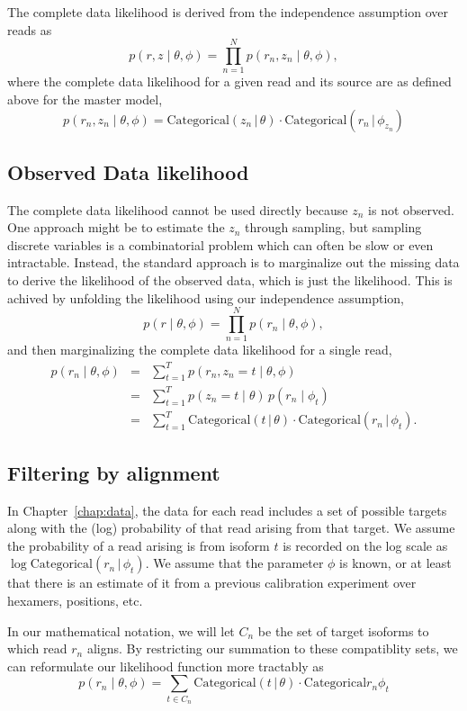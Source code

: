 \documentclass[11pt]{report}
\newcommand{\distro}[3]{\textrm{#1}\!\left( #2 \,|\, #3\right)}
\begin{document}
The complete data likelihood is derived from the independence
assumption over reads as
\[
  p(r, z \mid \theta, \phi)
  = \prod_{n=1}^N p(r_n, z_n \mid \theta, \phi),
\]
where the complete data likelihood for a given read and its source are
as defined above for the master model,
\[
  p(r_n, z_n \mid \theta, \phi)
  = \distro{Categorical}{z_n}{\theta}
  \cdot \distro{Categorical}{r_n}{\phi_{z_n}}
\]

\subsection{Observed Data likelihood}

The complete data likelihood cannot be used directly because $z_n$ is
not observed.  One approach might be to estimate the $z_n$ through
sampling, but sampling discrete variables is a combinatorial problem
which can often be slow or even intractable.  Instead, the standard
approach is to marginalize out the missing data to derive the
likelihood of the observed data, which is just the likelihood.  This
is achived by unfolding the likelihood using our independence
assumption,
\[
  p(r \mid \theta, \phi)
  = \prod_{n=1}^N p(r_n \mid \theta, \phi),
\]
and then marginalizing the complete data likelihood for a single read,
\begin{eqnarray*}
  p(r_n \mid \theta, \phi)
  & = & \textstyle \sum_{t=1}^T p(r_n, z_n = t \mid \theta, \phi)
  \\[4pt]
  & = & \textstyle \sum_{t=1}^T p(z_n = t \mid \theta) \, p(r_n \mid \phi_t)
  \\[4pt]
  & = & \textstyle \sum_{t=1}^T \distro{Categorical}{t}{\theta}
        \cdot \distro{Categorical}{r_n}{\phi_t}.
\end{eqnarray*}

\subsection{Filtering by alignment}

In Chapter~\ref{chap:data}, the data for each read includes a set of
possible targets along with the (log) probability of that read arising
from that target.  We assume the probability of a read arising is from
isoform $t$ is recorded on the log scale as
$\log \distro{Categorical}{r_n}{\phi_t}$.  We assume that the
parameter $\phi$ is known, or at least that there is an estimate of it
from a previous calibration experiment over hexamers, positions, etc.

In our mathematical notation, we will let $C_n$ be the set of target
isoforms to which read $r_n$ aligns.  By restricting our summation to
these compatiblity sets, we can reformulate our likelihood function
more tractably as
\[
  p(r_n \mid \theta, \phi)
  = \textstyle \sum_{t \in C_n}
  \distro{Categorical}{t}{\theta}
  \cdot \textrm{Categorical}{r_n}{\phi_t}
\]
\end{document}
